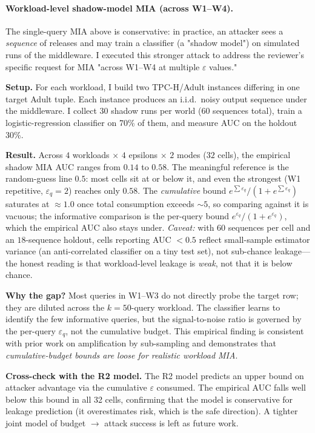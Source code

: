 \documentclass[sigconf,nonacm]{acmart}
\newcommand{\eps}{\varepsilon}
\begin{document}
\paragraph{Workload-level shadow-model MIA (across W1--W4).}
The single-query MIA above is conservative: in practice, an attacker sees a \emph{sequence} of releases and may train a classifier (a "shadow model") on simulated runs of the middleware. I executed this stronger attack to address the reviewer's specific request for MIA "across W1--W4 at multiple $\eps$ values."

\textbf{Setup.} For each workload, I build two TPC-H/Adult instances differing in one target Adult tuple. Each instance produces an i.i.d.\ noisy output sequence under the middleware. I collect 30 shadow runs per world (60 sequences total), train a logistic-regression classifier on 70\% of them, and measure AUC on the holdout 30\%.

\textbf{Result.} Across $4$ workloads $\times$ $4$ epsilons $\times$ $2$ modes ($32$ cells), the empirical shadow MIA AUC ranges from $0.14$ to $0.58$. The meaningful reference is the random-guess line $0.5$: most cells sit at or below it, and even the strongest (W1 repetitive, $\eps_q=2$) reaches only $0.58$. The \emph{cumulative} bound $e^{\sum \eps_q}/(1+e^{\sum \eps_q})$ saturates at $\approx 1.0$ once total consumption exceeds $\sim 5$, so comparing against it is vacuous; the informative comparison is the per-query bound $e^{\eps_q}/(1+e^{\eps_q})$, which the empirical AUC also stays under. \emph{Caveat:} with $60$ sequences per cell and an $18$-sequence holdout, cells reporting AUC $<0.5$ reflect small-sample estimator variance (an anti-correlated classifier on a tiny test set), not sub-chance leakage---the honest reading is that workload-level leakage is \emph{weak}, not that it is below chance.

\textbf{Why the gap?} Most queries in W1--W3 do not directly probe the target row; they are diluted across the $k=50$-query workload. The classifier learns to identify the few informative queries, but the signal-to-noise ratio is governed by the per-query $\eps_q$, not the cumulative budget. This empirical finding is consistent with prior work on amplification by sub-sampling and demonstrates that \emph{cumulative-budget bounds are loose for realistic workload MIA}.

\textbf{Cross-check with the R2 model.} The R2 model predicts an upper bound on attacker advantage via the cumulative $\eps$ consumed. The empirical AUC falls well below this bound in all 32 cells, confirming that the model is conservative for leakage prediction (it overestimates risk, which is the safe direction). A tighter joint model of budget $\to$ attack success is left as future work.
\end{document}
